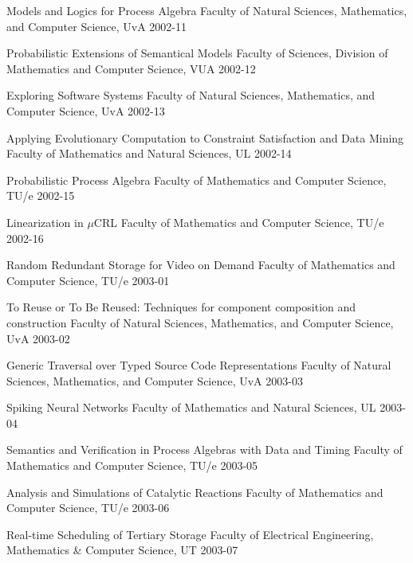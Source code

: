 \begin{multicols}{2}
	 {Models and Logics for Process Algebra}
         {Faculty of Natural Sciences, Mathematics, and Computer
          Science, UvA}
         {2002-11}

	 {Probabilistic Extensions of Semantical Models}
         {Faculty of Sciences, Division of Mathematics and Computer Science, VUA}
         {2002-12}


	 {Exploring Software Systems}
         {Faculty of Natural Sciences, Mathematics, and Computer
          Science, UvA}
         {2002-13}

	 {Applying Evolutionary Computation to Constraint Satisfaction and 
          Data Mining}
         {Faculty of Mathematics and Natural Sciences, UL}
         {2002-14}


	 {Probabilistic Process Algebra}
         {Faculty of Mathematics and Computer Science, TU/e}
         {2002-15}

	 {Linearization in $\mu$CRL}
         {Faculty of Mathematics and Computer Science, TU/e}
         {2002-16}


	 {Random Redundant Storage for Video on Demand}
         {Faculty of Mathematics and Computer Science, TU/e}
         {2003-01}

	 {To Reuse or To Be Reused: Techniques for component composition          and construction}
         {Faculty of Natural Sciences, Mathematics, and Computer
          Science, UvA}
         {2003-02}


	 {Generic Traversal over Typed Source Code Representations}
         {Faculty of Natural Sciences, Mathematics, and Computer
          Science, UvA}
         {2003-03}


	 {Spiking Neural Networks}
         {Faculty of Mathematics and Natural Sciences, UL}
         {2003-04}


	 {Semantics and Verification in Process Algebras with Data and           Timing}
         {Faculty of Mathematics and Computer Science, TU/e}
         {2003-05}

	 {Analysis and Simulations of Catalytic Reactions}
         {Faculty of Mathematics and Computer Science, TU/e}
         {2003-06}

	 {Real-time Scheduling of Tertiary Storage}
         {Faculty of Electrical Engineering, Mathematics \& Computer Science, UT}
         {2003-07}


\end{multicols}
